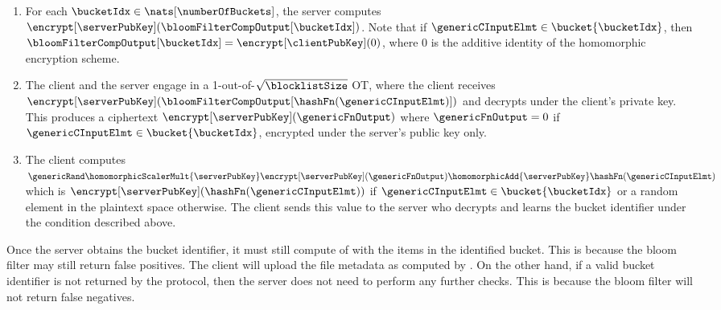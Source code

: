 \begin{enumerate}
\item  For each $\bucketIdx \in \nats[\numberOfBuckets]$, the server computes $\encrypt[\serverPubKey](\bloomFilterCompOutput[\bucketIdx])$. Note that if $\genericCInputElmt \in \bucket{\bucketIdx}$, then $\bloomFilterCompOutput[\bucketIdx] = \encrypt[\clientPubKey](0)$, where $0$ is the additive identity of the homomorphic encryption scheme. 

\item \label{ot} The client and the server engage in a 1-out-of-$\sqrt{\blocklistSize}$ OT, where the client receives $\encrypt[\serverPubKey](\bloomFilterCompOutput[\hashFn(\genericCInputElmt)])$ and decrypts under the client's private key. This produces a ciphertext $\encrypt[\serverPubKey](\genericFnOutput)$ where $\genericFnOutput = 0$ if $\genericCInputElmt \in \bucket{\bucketIdx}$, encrypted under the server's public key only. 

\item \label{client:upload} The client computes $\genericRand \homomorphicScalerMult{\serverPubKey}\encrypt[\serverPubKey](\genericFnOutput) \homomorphicAdd{\serverPubKey} \hashFn(\genericCInputElmt)$ which is $\encrypt[\serverPubKey](\hashFn(\genericCInputElmt))$ if $\genericCInputElmt \in \bucket{\bucketIdx}$ or a random element in the plaintext space \group otherwise. The client sends this value to the server who decrypts and learns the bucket identifier under the condition described above. 
\end{enumerate}

Once the server obtains the bucket identifier, it must still compute  of \checkContent with the items in the 
identified bucket. This is because the bloom filter may still return false positives. The client will upload the file metadata as computed by \uploadFile. On the other hand, if a valid bucket identifier is not returned by the protocol, then the server does not need to perform any further checks. This is because the bloom filter will not return false negatives. 

\fi




